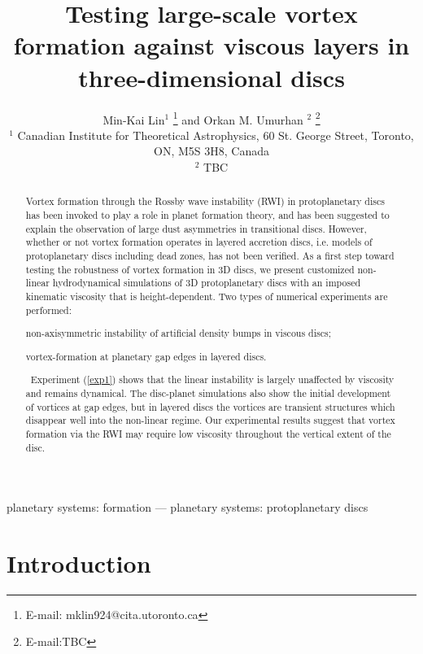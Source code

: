 \documentclass[useAMS,usenatbib]{mn2e}
\title[Vortices in viscous discs]{Testing large-scale 
  vortex formation against viscous layers in three-dimensional discs}
\author[Lin and Umurhan]{ Min-Kai Lin$^1$
  \thanks{E-mail: mklin924@cita.utoronto.ca} and Orkan M. Umurhan $^2$ \thanks{E-mail:TBC} \\
  $^1$ Canadian Institute for Theoretical Astrophysics,
  60 St. George Street, Toronto, ON, M5S 3H8, Canada \\
  $^2$ TBC
}
\begin{document}
\maketitle
\begin{abstract}
  Vortex formation through the Rossby wave 
  instability (RWI) in protoplanetary discs has been invoked to play a
  role in planet formation theory, and has been suggested to explain
  the observation of large dust asymmetries in transitional discs.   
  However, whether or not vortex formation operates in layered
  accretion discs, i.e. models of protoplanetary discs including dead zones, 
  has not been verified. As a first step toward testing the robustness of
  vortex formation in 3D discs, we present customized
  non-linear hydrodynamical 
  simulations of 3D protoplanetary discs with an imposed kinematic
  viscosity that is height-dependent. Two types of numerical 
  experiments are performed:
  \begin{inparaenum}[(i)]
  \item non-axisymmetric instability of artificial
    density bumps in viscous discs;\label{exp1}  
  \item vortex-formation at planetary gap edges in layered discs.%
  \end{inparaenum}\,
   Experiment (\ref{exp1}) shows that the linear instability is
   largely unaffected by viscosity and remains dynamical.   
   The disc-planet simulations  
   also show the initial development of vortices at gap edges, but in
   layered discs the vortices are transient structures which disappear  
   well into the non-linear regime. Our experimental results suggest that vortex
   formation via the RWI may require low viscosity throughout the 
   vertical extent of the disc. 
\end{abstract}

\begin{keywords}
planetary systems: formation --- planetary systems:
protoplanetary discs
\end{keywords}


\section{Introduction}\label{intro}

\end{document}
